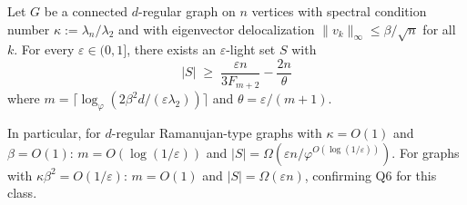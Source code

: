\begin{theorem}\label{thm:omega-q6-bounded-kappa}
Let $G$ be a connected $d$-regular graph on $n$ vertices with spectral
condition number $\kappa:=\lambda_n/\lambda_2$ and with
eigenvector delocalization $\|v_k\|_\infty\le\beta/\sqrt{n}$ for all $k$.
For every $\varepsilon\in(0,1]$, there exists an $\varepsilon$-light
set $S$ with
\[
|S| \;\ge\; \frac{\varepsilon n}{3F_{m+2}} - \frac{2n}{\theta}
\]
where $m=\lceil\log_\varphi(2\beta^2d/(\varepsilon\lambda_2))\rceil$
and $\theta=\varepsilon/(m+1)$.

In particular, for $d$-regular Ramanujan-type graphs with
$\kappa=O(1)$ and $\beta=O(1)$: $m=O(\log(1/\varepsilon))$ and
$|S|=\Omega(\varepsilon n/\varphi^{O(\log(1/\varepsilon))})$.
For graphs with $\kappa\beta^2=O(1/\varepsilon)$:
$m=O(1)$ and $|S|=\Omega(\varepsilon n)$,
confirming Q6 for this class.
\end{theorem}


